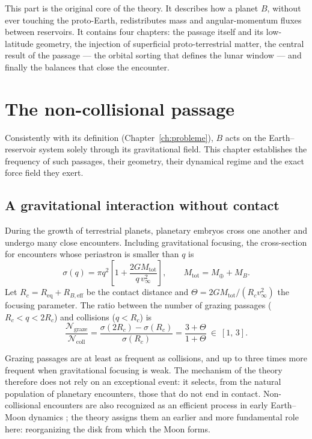 \documentclass[11pt,a4paper,openany]{report}
\newcommand{\Mt}{M_{\oplus}}
\newcommand{\Req}{R_{\mathrm{eq}}}
\newcommand{\Mtot}{M_{\mathrm{tot}}}
\begin{document}
\noindent
This part is the original core of the theory. It describes how a planet $B$, without ever touching
the proto-Earth, redistributes mass and angular-momentum fluxes between reservoirs. It contains
four chapters: the passage itself and its low-latitude geometry, the injection of superficial
proto-terrestrial matter, the central result of the passage --- the orbital sorting that defines the
lunar window --- and finally the balances that close the encounter.

\chapter{The non-collisional passage}
\label{ch:passage}\label{sec:passage}

Consistently with its definition (Chapter~\ref{ch:probleme}), $B$ acts on the Earth--reservoir
system solely through its gravitational field. This chapter establishes the frequency of such
passages, their geometry, their dynamical regime and the exact force field they exert.

\section{A gravitational interaction without contact}

During the growth of terrestrial planets, planetary embryos cross one another and undergo many
close encounters. Including gravitational focusing, the cross-section for encounters whose
periastron is smaller than $q$ is
\begin{equation}
\sigma(q)=\pi q^2\left[1+\frac{2G\Mtot}{q\,v_\infty^2}\right],
\qquad \Mtot=\Mt+M_B.
\label{eq:sigma}
\end{equation}
Let $R_c=\Req+R_{B,\mathrm{eff}}$ be the contact distance and
$\Theta=2G\Mtot/(R_c v_\infty^2)$ the focusing parameter. The ratio between the number of grazing
passages ($R_c<q<2R_c$) and collisions ($q<R_c$) is
\begin{equation}
\frac{\mathcal{N}_{\mathrm{graze}}}{\mathcal{N}_{\mathrm{coll}}}
=\frac{\sigma(2R_c)-\sigma(R_c)}{\sigma(R_c)}
=\frac{3+\Theta}{1+\Theta}\ \in\ [1,\,3].
\label{eq:frequence}
\end{equation}

\begin{apport}
Grazing passages are at least as frequent as collisions, and up to three times more frequent when
gravitational focusing is weak. The mechanism of the theory therefore does not rely on an
exceptional event: it selects, from the natural population of planetary encounters, those that do
not end in contact. Non-collisional encounters are also recognized as an efficient process in early
Earth--Moon dynamics \cite{PahlevanMorbidelli2015}; the theory assigns them an earlier and more
fundamental role here: reorganizing the disk from which the Moon forms.
\end{apport}
\end{document}
